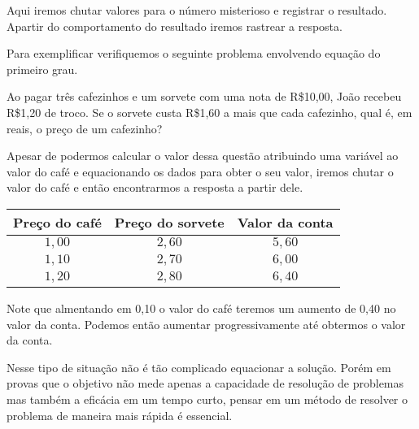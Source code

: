 Aqui iremos chutar valores para o número misterioso e registrar o resultado. Apartir do comportamento do resultado iremos rastrear a resposta.

Para exemplificar verifiquemos o seguinte problema envolvendo equação do primeiro grau.

\begin{exe}
Ao pagar três cafezinhos e um sorvete com uma nota de R\$10,00, João recebeu R\$1,20 de troco. Se o sorvete custa R\$1,60 a mais que cada cafezinho, qual é, em reais, o preço de um cafezinho?
\end{exe}

Apesar de podermos calcular o valor dessa questão atribuindo uma variável ao valor do café e equacionando os dados para obter o seu valor, iremos chutar o valor do café e então encontrarmos a resposta a partir dele.

\begin{table}[h]
\centering
\begin{tabular}{c|c |c}
   Preço do café  & Preço do sorvete & Valor da conta \\
   \hline
  $1,00$   & $2,60$  & $5,60$\\
  $1,10$   & $2,70$  & $6,00$\\
  $1,20$   & $2,80$  & $6,40$\\
  \hline
\end{tabular}
\end{table}

Note que almentando em 0,10 o valor do café teremos um aumento de 0,40 no valor da conta. Podemos então aumentar progressivamente até obtermos o valor da conta.

Nesse tipo de situação não é tão complicado equacionar a solução. Porém em provas que o objetivo não mede apenas a capacidade de resolução de problemas mas também a eficácia em um tempo curto, pensar em um método de resolver o problema de maneira mais rápida é essencial.

